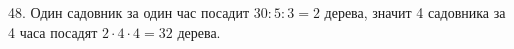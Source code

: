 48. Один садовник за один час посадит $30:5:3=2$ дерева, значит 4 садовника за 4 часа посадят $2\cdot4\cdot4=32$ дерева.\\
